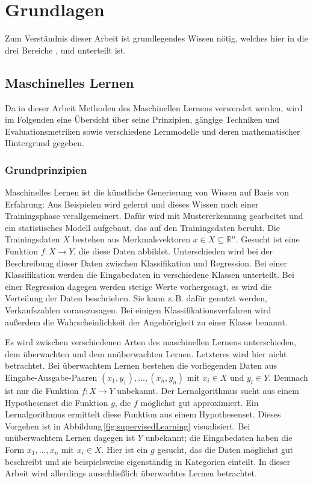 \chapter{Grundlagen}\label{grundlagen}

Zum Verständnis dieser Arbeit ist grundlegendes Wissen nötig, welches hier in die drei Bereiche ,  und  unterteilt ist.


\section{Maschinelles Lernen}\label{ml-grundlagen}

Da in dieser Arbeit Methoden des Maschinellen Lernens verwendet werden, wird im Folgenden eine Übersicht über seine Prinzipien, gängige Techniken und Evaluationsmetriken sowie verschiedene Lernmodelle und deren mathematischer Hintergrund gegeben.

	\subsection{Grundprinzipien}
	
	Maschinelles Lernen ist die \glqq künstliche\grqq{} Generierung von Wissen auf Basis von Erfahrung: Aus Beispielen wird gelernt und dieses Wissen nach einer Trainingsphase verallgemeinert. Dafür wird mit Mustererkennung gearbeitet und ein statistisches Modell aufgebaut, das auf den Trainingsdaten beruht. Die Trainingsdaten $X$ bestehen aus Merkmalsvektoren $x \in X \subseteq \mathbb{R}^n$. %
	Gesucht ist eine Funktion $f: X \to Y$,%
	 die diese Daten abbildet. Unterschieden wird bei der Beschreibung dieser Daten zwischen Klassifikation und Regression. Bei einer Klassifikation werden die Eingabedaten in verschiedene Klassen unterteilt. Bei einer Regression dagegen werden stetige Werte vorhergesagt, es wird die Verteilung der Daten beschrieben. Sie kann z.\,B. dafür genutzt werden, Verkaufszahlen vorauszusagen. Bei einigen Klassifikationsverfahren wird außerdem die Wahrscheinlichkeit der Angehörigkeit zu einer Klasse benannt.
	
	Es wird zwischen verschiedenen Arten des maschinellen Lernens unterschieden, dem überwachten und dem unüberwachten Lernen. Letzteres wird hier nicht betrachtet. Bei überwachtem Lernen bestehen die vorliegenden Daten aus Eingabe-Ausgabe-Paaren $(x_1, y_1), ...,(x_n, y_n) \text{ mit } x_i \in X \text{ und } y_i \in Y$. %
	 Demnach ist nur die Funktion $f: X \to Y$ unbekannt. Der Lernalgorithmus sucht aus einem Hypothesenset die Funktion $g$, die $f$ möglichst gut approximiert. Ein Lernalgorithmus ermittelt diese Funktion aus einem Hypothesenset. Dieses Vorgehen ist in Abbildung\,\ref{fig:supervisedLearning} visualisiert. Bei unüberwachtem Lernen dagegen ist $Y$ unbekannt; die Eingabedaten haben die Form $x_1, ..., x_n \text{ mit } x_i \in X$. Hier ist ein $g$ gesucht, das die Daten möglichst gut beschreibt und sie beispielsweise eigenständig in Kategorien einteilt. In dieser Arbeit wird allerdings ausschließlich überwachtes Lernen betrachtet.
	
